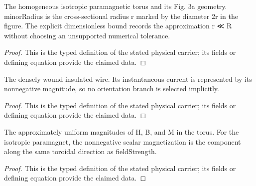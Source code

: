 \begin{definition}
  \label{def:physics:IPhO_2026_3_A_1:aux013}
  The homogeneous isotropic paramagnetic torus and its Fig. 3a geometry. minorRadius is the cross-sectional radius r marked by the diameter 2r in the figure. The explicit dimensionless bound records the approximation r ≪ R without choosing an unsupported numerical tolerance.
\end{definition}
\begin{proof}
  This is the typed definition of the stated physical carrier; its fields or defining equation provide the claimed data.
\end{proof}

\begin{definition}
  \label{def:physics:IPhO_2026_3_A_1:aux014}
  The densely wound insulated wire. Its instantaneous current is represented by its nonnegative magnitude, so no orientation branch is selected implicitly.
\end{definition}
\begin{proof}
  This is the typed definition of the stated physical carrier; its fields or defining equation provide the claimed data.
\end{proof}

\begin{definition}
  \label{def:physics:IPhO_2026_3_A_1:aux015}
  The approximately uniform magnitudes of H, B, and M in the torus. For the isotropic paramagnet, the nonnegative scalar magnetization is the component along the same toroidal direction as fieldStrength.
\end{definition}
\begin{proof}
  This is the typed definition of the stated physical carrier; its fields or defining equation provide the claimed data.
\end{proof}

